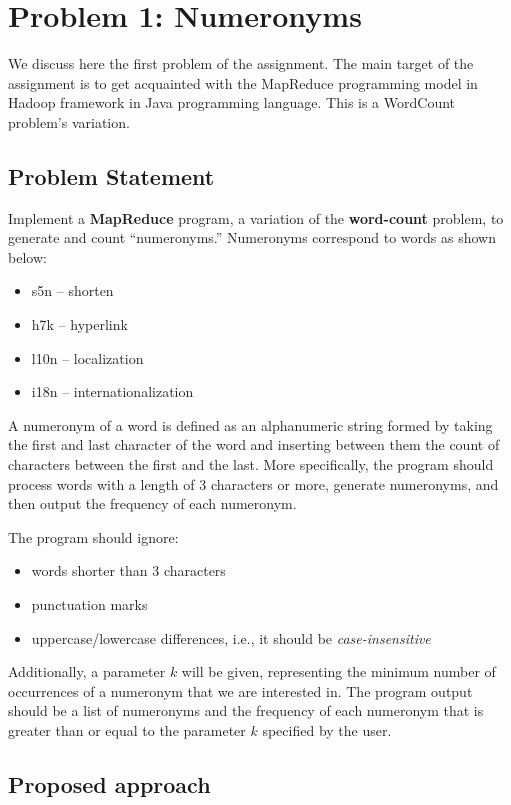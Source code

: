 \documentclass[acmlarge]{acmart}
\begin{document}
\section{Problem 1: Numeronyms}
\label{sec:problem1}
We discuss here the first problem of the assignment.
The main target of the assignment is to get acquainted with the MapReduce programming model in Hadoop framework in
Java programming language.
This is a WordCount problem's variation.

\subsection{Problem Statement}
Implement a \textbf{MapReduce} program, a variation of the \textbf{word-count} problem, to generate and count
``numeronyms.'' Numeronyms correspond to words as shown below:

\begin{itemize}
  \item s5n – shorten
  \item h7k – hyperlink
  \item l10n – localization
  \item i18n – internationalization
\end{itemize}

A numeronym of a word is defined as an alphanumeric string formed by taking the first and last character of the word and
inserting between them the count of characters between the first and the last.
More specifically, the program should process words with a length of 3 characters or more, generate numeronyms, and then
output the frequency of each numeronym.

The program should ignore:
\begin{itemize}
  \item words shorter than 3 characters
  \item punctuation marks
  \item uppercase/lowercase differences, i.e., it should be \textit{case-insensitive}
\end{itemize}

Additionally, a parameter $k$ will be given, representing the minimum number of occurrences of a numeronym that we are
interested in.
The program output should be a list of numeronyms and the frequency of each numeronym that is greater than or equal to
the parameter $k$ specified by the user.

\subsection{Proposed approach}
\end{document}
